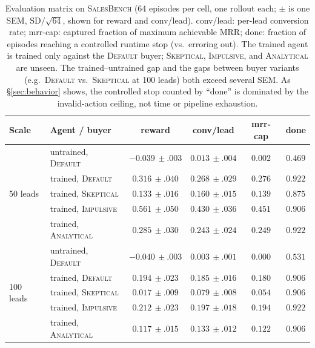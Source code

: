 \documentclass{article} %
\newcommand{\salesbench}{\textsc{SalesBench}}
\begin{document}
\begin{table}[t]
\centering
\small
\setlength{\tabcolsep}{4.5pt}
\newcommand{\sem}[1]{{\scriptscriptstyle\,\pm#1}}
\begin{tabular}{llcccc}
\toprule
\textbf{Scale} & \textbf{Agent / buyer} & \textbf{reward} & \textbf{conv/lead} & \textbf{mrr-cap} & \textbf{done} \\
\midrule
\multirow{5}{*}{50 leads}
 & untrained, \textsc{Default}   & $-0.039\sem{.003}$ & $0.013\sem{.004}$ & $0.002$ & $0.469$ \\
 & trained, \textsc{Default}     & $0.316\sem{.040}$  & $0.268\sem{.029}$ & $0.276$ & $0.922$ \\
 & trained, \textsc{Skeptical}   & $0.133\sem{.016}$  & $0.160\sem{.015}$ & $0.139$ & $0.875$ \\
 & trained, \textsc{Impulsive}   & $0.561\sem{.050}$  & $0.430\sem{.036}$ & $0.451$ & $0.906$ \\
 & trained, \textsc{Analytical}  & $0.285\sem{.030}$  & $0.243\sem{.024}$ & $0.249$ & $0.922$ \\
\midrule
\multirow{5}{*}{100 leads}
 & untrained, \textsc{Default}   & $-0.040\sem{.003}$ & $0.003\sem{.001}$ & $0.000$ & $0.531$ \\
 & trained, \textsc{Default}     & $0.194\sem{.023}$  & $0.185\sem{.016}$ & $0.180$ & $0.906$ \\
 & trained, \textsc{Skeptical}   & $0.017\sem{.009}$  & $0.079\sem{.008}$ & $0.054$ & $0.906$ \\
 & trained, \textsc{Impulsive}   & $0.212\sem{.023}$  & $0.197\sem{.018}$ & $0.194$ & $0.922$ \\
 & trained, \textsc{Analytical}  & $0.117\sem{.015}$  & $0.133\sem{.012}$ & $0.122$ & $0.906$ \\
\bottomrule
\end{tabular}
\caption{Evaluation matrix on \salesbench{} (64 episodes per cell, one rollout each; $\pm$ is one SEM, $\mathrm{SD}/\sqrt{64}$,
shown for reward and conv/lead). conv/lead: per-lead conversion rate; mrr-cap: captured fraction of maximum achievable MRR;
done: fraction of episodes reaching a controlled runtime stop (vs.\ erroring out). The trained agent is trained only against
the \textsc{Default} buyer; \textsc{Skeptical}, \textsc{Impulsive}, and \textsc{Analytical} are unseen. The trained--untrained
gap and the gaps between buyer variants (e.g.\ \textsc{Default} vs.\ \textsc{Skeptical} at 100 leads) both exceed several SEM.
As \S\ref{sec:behavior} shows, the controlled stop counted by ``done'' is dominated by the invalid-action ceiling, not time
or pipeline exhaustion.}
\label{tab:matrix}
\end{table}
\end{document}
